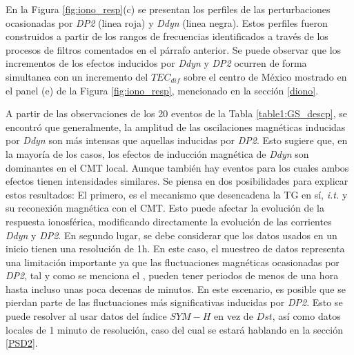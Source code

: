 En la Figura \ref{fig:iono_resp}(c) se presentan los perfiles de las perturbaciones ocasionadas por \emph{DP2} (linea roja) y \emph{Ddyn} (linea negra). Estos perfiles fueron construidos a partir de los rangos de frecuencias identificados a través de los procesos de filtros comentados en el párrafo anterior. Se puede observar que los incrementos de los efectos inducidos por \emph{Ddyn} y \emph{DP2} ocurren de forma simultanea con un incremento del $TEC_{dif}$ sobre el centro de México mostrado en el panel (e) de la Figura \ref{fig:iono_resp}, mencionado en la sección \ref{diono}. 
\vspace{1 em}


A partir de las observaciones de los 20 eventos de la Tabla \ref{table1:GS_descp}, se encontró que generalmente, la amplitud de las oscilaciones magnéticas inducidas por \emph{Ddyn} son más intensas que aquellas inducidas por \emph{DP2}. Esto sugiere que, en la mayoría de los casos, los efectos de inducción magnética de \emph{Ddyn} son dominantes en el CMT local. Aunque también hay eventos para los cuales ambos efectos tienen intensidades similares. Se piensa en dos posibilidades para explicar estos resultados: El primero, es el mecanismo que desencadena la TG en sí, \emph{i.t.} y su reconexión magnética con el CMT. Esto puede afectar la evolución de la respuesta ionosférica, modificando directamente la evolución de las corrientes \emph{Ddyn} y \emph{DP2}. En segundo lugar, se debe considerar que los datos usados en un inicio tienen una resolución de 1h. En este caso, el muestreo de datos representa una limitación importante ya que las fluctuaciones magnéticas ocasionadas por \emph{DP2}, tal y como se menciona el \cite{nishida_68_fluctuations}, pueden tener periodos de menos de una hora hasta incluso unas poca decenas de minutos. En este escenario, es posible que se pierdan parte de las fluctuaciones más significativas inducidas por \emph{DP2}. Esto se puede resolver al usar datos del índice $SYM-H$ en vez de $Dst$, así como datos locales de 1 minuto de resolución, caso del cual se estará hablando en la sección \ref{PSD2}. 
\vspace{1 em}


